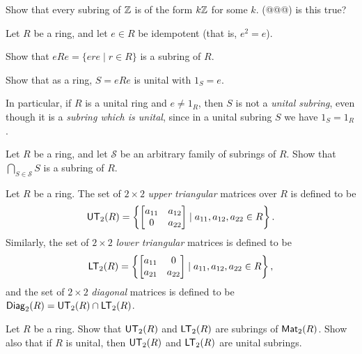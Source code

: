 \begin{exercise}
Show that every subring of \(\mathbb{Z}\) is of the form \(k\mathbb{Z}\) for some \(k\). (@@@) is this true?
\end{exercise}

\begin{exercise}
Let \(R\) be a ring, and let \(e \in R\) be idempotent (that is, \(e^2 = e\)).
\begin{proplist*}
\item Show that \(eRe = \{ ere \mid r \in R \}\) is a subring of \(R\).
\item Show that as a ring, \(S = eRe\) is unital with \(1_S = e\).
\end{proplist*}
In particular, if \(R\) is a unital ring and \(e \neq 1_R\), then \(S\) is not a \emph{unital subring}, even though it is a \emph{subring which is unital}, since in a unital subring \(S\) we have \(1_S = 1_R\).
\end{exercise}

\begin{exercise}
Let \(R\) be a ring, and let \(\mathcal{S}\) be an arbitrary family of subrings of \(R\). Show that \(\bigcap_{S \in \mathcal{S}} S\) is a subring of \(R\).
\end{exercise}

\begin{dfn} \label{dfn:triangular-diagonal-matrix}
Let \(R\) be a ring. The set of \(2 \times 2\) \emph{upper triangular} matrices over \(R\) is defined to be \[ \mathsf{UT}_{2}(R) = \left\{ \begin{bmatrix} a_{11} & a_{12} \\ 0 & a_{22} \end{bmatrix} \mid a_{11}, a_{12}, a_{22} \in R \right\}. \] Similarly, the set of \(2 \times 2\) \emph{lower triangular} matrices is defined to be \[ \mathsf{LT}_{2}(R) = \left\{ \begin{bmatrix} a_{11} & 0 \\ a_{21} & a_{22} \end{bmatrix} \mid a_{11}, a_{12}, a_{22} \in R \right\}, \] and the set of \(2 \times 2\) \emph{diagonal} matrices is defined to be \(\mathsf{Diag}_{2}(R) = \mathsf{UT}_{2}(R) \cap \mathsf{LT}_{2}(R)\).
\end{dfn}

\begin{exercise}
Let \(R\) be a ring. Show that \(\mathsf{UT}_{2}(R)\) and \(\mathsf{LT}_{2}(R)\) are subrings of \(\mathsf{Mat}_{2}(R)\). Show also that if \(R\) is unital, then \(\mathsf{UT}_{2}(R)\) and \(\mathsf{LT}_{2}(R)\) are unital subrings.
\end{exercise}

